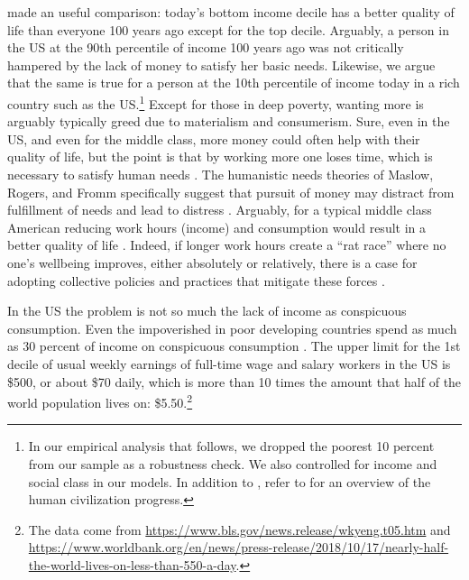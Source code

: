 \documentclass[10pt, letterpaper]{article}
\begin{document}
\begin{spacing}{1.8}
\citet{bok10} made an useful comparison: today's bottom income decile has a
better quality of life than everyone 100 years ago except for the top
decile. Arguably, a person in the US at the 90th percentile of income 100 years
ago was not critically hampered by the lack of money to satisfy her basic needs. Likewise, we argue that the same is true for a person  at the 10th percentile of
income today in a rich country such as the US.\footnote{In our empirical analysis that follows, we dropped the poorest 10 percent from our sample as a robustness check. We also controlled for income and social class in our models. In addition to
  \citet{bok10}, refer to \citet[e.g.,][]{pinker18} for an overview of the human civilization progress.}
Except for those in deep poverty, wanting more is arguably typically greed due
to materialism and consumerism.
Sure, even in the US, and even for the middle class, more money could often help
with their quality of life, but the point is that by working more one loses
time, which is necessary to satisfy human needs \citep{maslow87}. The humanistic needs theories of Maslow, Rogers, and Fromm  
 specifically suggest that pursuit of money may distract from fulfillment of
 needs and lead to distress \citep[cited in][]{kasser93}.
 Arguably, for a typical middle class American reducing work hours (income) and
 consumption would result in a better quality of life
 \citep{dittmar14,kasser13,hsee13,leonard10}.
 Indeed, if longer work hours create a ``rat race'' where no one's wellbeing improves, either absolutely or relatively, there is a case for adopting collective policies and practices that mitigate these forces \citep{jauch2020rat,hamermesh2017does,golden2009brief}.

In the US the problem is not so much the lack of income as conspicuous consumption.  
Even the impoverished in poor developing countries spend as much as 30 percent of income on conspicuous consumption \citep{banerjee11}. %
 The upper limit for the 1st decile of usual weekly earnings of full-time wage and salary workers in the US is \$500, or about \$70 daily, which is more than 10
times the amount that half of the world population lives on:
\$5.50.\footnote{The data come from
  \url{https://www.bls.gov/news.release/wkyeng.t05.htm} and
  \url{https://www.worldbank.org/en/news/press-release/2018/10/17/nearly-half-the-world-lives-on-less-than-550-a-day}.}


\end{spacing}
\end{document}
